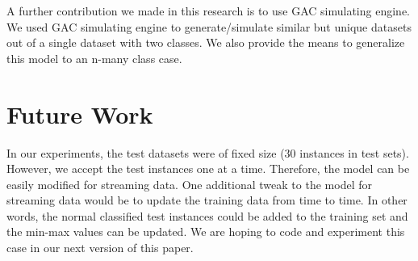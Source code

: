 \documentclass[conference]{IEEEtran}
\begin{document}
A further contribution we made in this research is to use GAC simulating engine.
We used GAC simulating engine to generate/simulate similar but unique datasets out of a single dataset with two classes.
We also provide the means to generalize this model to an n-many class case.

\section{Future Work}
In our experiments, the test datasets were of fixed size ($30$ instances in test sets).
However, we accept the test instances one at a time.
Therefore, the model can be easily modified for streaming data.
One additional tweak to the model for streaming data would be to update the training data from time to time.
In other words, the normal classified test instances could be added to the training set and the min-max values can be updated.
We are hoping to code and experiment this case in our next version of this paper.



\end{document}

